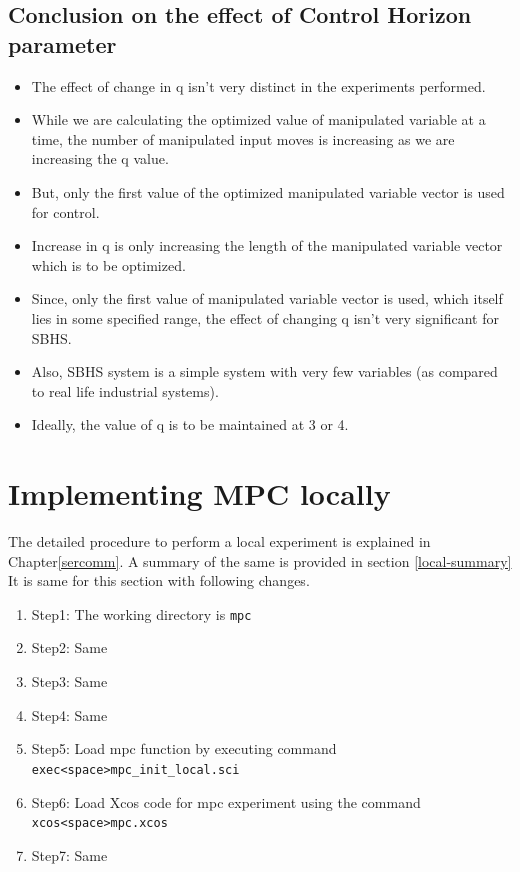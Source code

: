 \subsection{Conclusion on the effect of Control Horizon parameter }
\begin{itemize}
\item The effect of change in q isn’t very distinct in the experiments performed.
\item While we are calculating the optimized value of manipulated variable at a time, the number of manipulated input moves is increasing as we are increasing the q value. 
\item But, only the first value of the optimized manipulated variable vector is used for control. 
\item Increase in q is only increasing the length of the manipulated variable vector which is to be optimized.
\item Since, only the first value of manipulated variable vector is used, which itself lies in some specified range, the effect of changing q isn’t very significant for SBHS.
\item Also, SBHS system is a simple system with very few variables (as compared to real life industrial systems).
\item Ideally, the value of q is to be maintained at 3 or 4.
\end{itemize}

\section{Implementing MPC locally}

The detailed procedure to perform a local experiment is explained in Chapter\ref{sercomm}. A summary of the same is provided in section \ref{local-summary} It is same for this section with following changes.

\begin{enumerate}
\item Step1: The working directory is {\tt  mpc}
\item Step2: Same
\item Step3: Same
\item Step4: Same
\item Step5: Load mpc function by executing command\\ {\tt exec<space>mpc\_init\_local.sci}
\item Step6: Load Xcos code for mpc experiment using the command\\ {\tt xcos<space>mpc.xcos}
\item Step7: Same
\end{enumerate}


